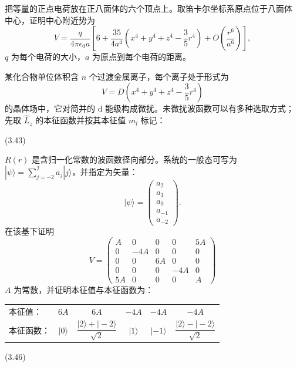  把等量的正点电荷放在正八面体的六个顶点上。取笛卡尔坐标系原点位于八面体
中心，证明中心附近势为
\begin{equation*}
V = \frac{q}{4\pi\epsilon_0 a}\left[6 + \frac{35}{4a^{4}}\left(x^{4}+y^{4}+z^{4}-\frac{3}{5}r^{4}\right) + O\left(\frac{r^{6}}{a^{6}}\right)\right],\tag{3.41}
\end{equation*}
$q$ 为每个电荷的大小，$a$ 为原点到每个电荷的距离。

 某化合物单位体积含 $n$ 个过渡金属离子，每个离子处于形式为
\begin{equation*}
V = D\left(x^{4}+y^{4}+z^{4}-\frac{3}{5}r^{4}\right)\tag{3.42}
\end{equation*}
的晶体场中，它对简并的 d 能级构成微扰。未微扰波函数可以有多种选取方式；先取
$\hat{L}_z$ 的本征函数并按其本征值 $m_l$ 标记：
\begin{center}
\qquad(3.43)
\end{center}
$R(r)$ 是含归一化常数的波函数径向部分。系统的一般态可写为
$|\psi\rangle=\sum_{j=-2}^{2}a_j|j\rangle$，并指定为矢量：
\begin{equation*}
|\psi\rangle = \begin{pmatrix}a_2\\a_1\\a_0\\a_{-1}\\a_{-2}\end{pmatrix}.\tag{3.44}
\end{equation*}
在该基下证明
\begin{equation*}
V = \begin{pmatrix} A & 0 & 0 & 0 & 5A\\ 0 & -4A & 0 & 0 & 0\\ 0 & 0 & 6A & 0 & 0\\ 0 & 0 & 0 & -4A & 0\\ 5A & 0 & 0 & 0 & A \end{pmatrix}\tag{3.45}
\end{equation*}
$A$ 为常数，并证明本征值与本征函数为：
\begin{center}
\begin{tabular}{lccccc}
本征值： & $6A$ & $6A$ & $-4A$ & $-4A$ & $-4A$\\[2pt]
本征函数： & $|0\rangle$ & $\dfrac{|2\rangle+|-2\rangle}{\sqrt{2}}$ & $|1\rangle$ & $|-1\rangle$ & $\dfrac{|2\rangle-|-2\rangle}{\sqrt{2}}$
\end{tabular}\hfill(3.46)
\end{center}
